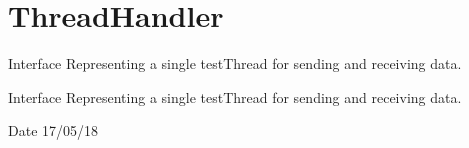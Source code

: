 \hypertarget{group__ThreadHandler}{}\section{Thread\+Handler}
\label{group__ThreadHandler}


Interface Representing a single test\+Thread for sending and receiving data.  


Interface Representing a single test\+Thread for sending and receiving data. 

\begin{DoxyDate}{Date}
17/05/18 
\end{DoxyDate}
